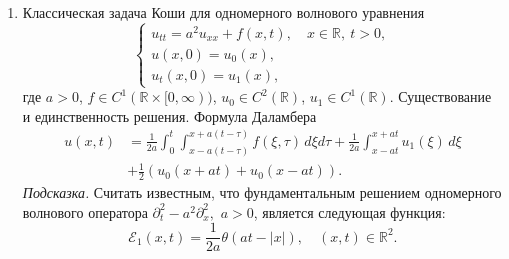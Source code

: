 \documentclass[12pt,a4paper,draft]{article}
\DeclareRobustCommand*{\т}{~--- }
\DeclareRobustCommand*{\ч}{~-- }
\begin{document}
\begin{enumerate}
\item
Классическая задача Коши для одномерного волнового уравнения
$$
    \left\{
        \begin{array}{l}
            u_{tt} = a^2 u_{xx} + f (x, t),
            \quad
            x \in {\mathbb R},
            \:
            t > 0,
            \\
            u (x, 0) = u_0 (x),
            \\
            u_t (x, 0) = u_1 (x),
        \end{array}
    \right.
$$
где $a > 0$, $f \in C^1 ({\mathbb R} \times [0, \infty))$, $u_0
\in C^2 ({\mathbb R})$, $u_1 \in C^1 ({\mathbb R})$.
Существование и единственность решения. Формула Даламбера
\begin{align*}
    u (x, t)
    &
    =
    \frac{1}{2 a}
    \int_0^t
    \int_{
        x - a (t - \tau)
    }^{
        x + a (t - \tau)
    }
    f (\xi, \tau)
    \,
    d\xi
    d\tau
    +
    \frac{1}{2 a}
    \int_{
        x - a t
    }^{
        x + a t
    }
    u_1 (\xi)
    \,
    d\xi
    \\
    &
    +
    \frac{1}{2}
    (
        u_0 (x + at)
        +
        u_0 (x - at)
    ).
    \nonumber
\end{align*}
{\it Подсказка.} Считать известным, что фундаментальным решением
одномерного волнового оператора $
    \partial_t^2 - a^2 \partial_x^2,
$ $a > 0$, является следующая функция:
$$
    {\mathcal E}_1 (x, t)
    =
    \frac{1}{2 a}
    \theta (a t - |x|),
    \quad
    (x, t)
    \in
    {\mathbb R}^2.
$$


\end{enumerate}
\end{document}
